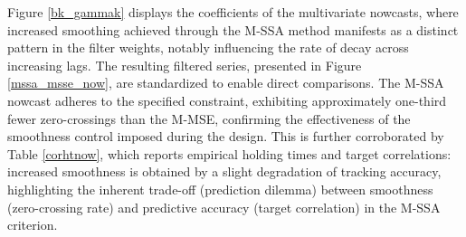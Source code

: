 \documentclass[a4paper]{article}
\begin{document}
Figure \ref{bk_gammak} displays the coefficients of the multivariate nowcasts, where increased smoothing achieved through the M-SSA method manifests as a distinct pattern in the filter weights, notably influencing the rate of decay across increasing lags. The resulting filtered series, presented in Figure \ref{mssa_msse_now}, are standardized to enable direct comparisons. The M-SSA nowcast adheres to the specified constraint, exhibiting approximately one-third fewer zero-crossings than the M-MSE, confirming the effectiveness of the smoothness control imposed during the design. This is further corroborated by Table \ref{corhtnow}, which reports empirical holding times and target correlations: increased smoothness is obtained by a slight degradation of tracking accuracy, highlighting the inherent trade-off (prediction dilemma) between smoothness (zero-crossing rate) and predictive accuracy (target correlation) in the M-SSA criterion.
\end{document}
